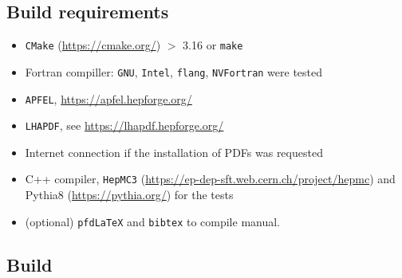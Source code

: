 \documentclass[12pt]{article}
\begin{document}
\subsection{Build requirements}

\begin{itemize}
 \item \texttt{CMake} (\url{https://cmake.org/}) $>$ 3.16 or \texttt{make}
 \item Fortran compiller: \texttt{GNU}, \texttt{Intel}, \texttt{flang}, \texttt{NVFortran} were tested
 \item \texttt{APFEL}, \url{https://apfel.hepforge.org/}
 \item \texttt{LHAPDF}, see \url{https://lhapdf.hepforge.org/}
 \item Internet connection if the installation of PDFs was requested
 \item C++ compiler, \texttt{HepMC3} (\url{https://ep-dep-sft.web.cern.ch/project/hepmc}) and Pythia8 (\url{https://pythia.org/}) for the tests
 \item (optional) \texttt{pfdLaTeX} and \texttt{bibtex}  to compile manual.
\end{itemize}

\subsection{Build}
\end{document}
